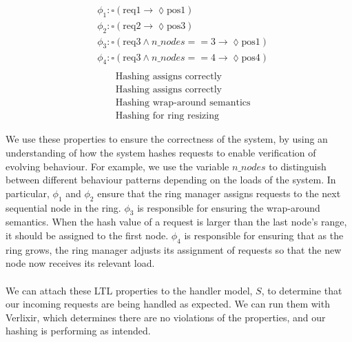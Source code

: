 \begin{multicols}{2}
    \[
        \begin{aligned}
        & \phi_1: \square ( \text{req1} \rightarrow \lozenge \text{pos1} ) \\
        & \phi_2: \square ( \text{req2} \rightarrow \lozenge \text{pos3} ) \\
        & \phi_3: \square ( \text{req3} \land n\_nodes == 3 \rightarrow \lozenge \text{pos1} ) \\
        & \phi_4: \square ( \text{req3} \land n\_nodes == 4 \rightarrow \lozenge \text{pos4} ) \\
        \end{aligned}
    \]
    \vline
    \[
    \begin{aligned}
    &\text{Hashing assigns correctly} \\
    &\text{Hashing assigns correctly} \\
    &\text{Hashing wrap-around semantics} \\
    &\text{Hashing for ring resizing}
    \end{aligned}
    \]
\end{multicols}
We use these properties to ensure the correctness of the system, by using an understanding of how the system hashes requests to enable verification of evolving behaviour. For example, we use the variable $n\_nodes$ to distinguish between different behaviour patterns depending on the loads of the system. In particular, $\phi_1$ and $\phi_2$ ensure that the ring manager assigns requests to the next sequential node in the ring. $\phi_3$ is responsible for ensuring the wrap-around semantics. When the hash value of a request is larger than the last node's range, it should be assigned to the first node. $\phi_4$ is responsible for ensuring that as the ring grows, the ring manager adjusts its assignment of requests so that the new node now receives its relevant load.
\\ \\
We can attach these LTL properties to the handler model, $S$, to determine that our incoming requests are being handled as expected. We can run them with Verlixir, which determines there are no violations of the properties, and our hashing is performing as intended.
